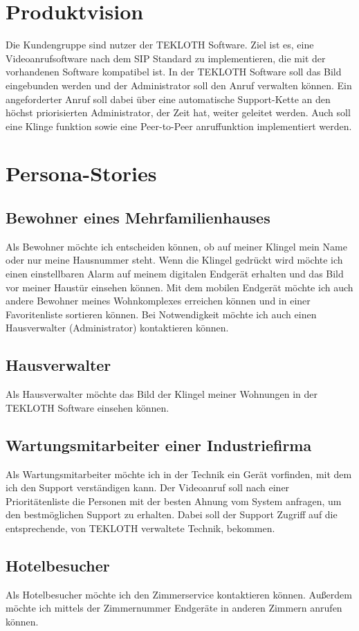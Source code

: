 \documentclass[12pt]{article}
\begin{document}
    \section{Produktvision}\label{sec:produktvision}
    Die Kundengruppe sind nutzer der TEKLOTH Software.
    Ziel ist es, eine Videoanrufsoftware nach dem SIP Standard zu implementieren, die mit der vorhandenen Software kompatibel ist.
    In der TEKLOTH Software soll das Bild eingebunden werden und der Administrator soll den Anruf verwalten können.
    Ein angeforderter Anruf soll dabei über eine automatische Support-Kette an den höchst priorisierten Administrator, der Zeit hat, weiter geleitet werden.
    Auch soll eine Klinge funktion sowie eine Peer-to-Peer anruffunktion implementiert werden.

    \section{Persona-Stories}\label{sec:persona-stories}
    \subsection{Bewohner eines Mehrfamilienhauses}\label{subsec:bewohner-eines-mehrfamilienhauses}
    Als Bewohner möchte ich entscheiden können, ob auf meiner Klingel mein Name oder nur meine Hausnummer steht.
    Wenn die Klingel gedrückt wird möchte ich einen einstellbaren Alarm auf meinem digitalen Endgerät erhalten und das Bild vor meiner Haustür einsehen können.
    Mit dem mobilen Endgerät möchte ich auch andere Bewohner meines Wohnkomplexes erreichen können und in einer Favoritenliste sortieren können.
    Bei Notwendigkeit möchte ich auch einen Hausverwalter (Administrator) kontaktieren können.


    \subsection{Hausverwalter}\label{subsec:hausverwalter}
    Als Hausverwalter möchte das Bild der Klingel meiner Wohnungen in der TEKLOTH Software einsehen können.


    \subsection{Wartungsmitarbeiter einer Industriefirma}\label{subsec:wartungsmitarbeiter-einer-industriefirma}
    Als Wartungsmitarbeiter möchte ich in der Technik ein Gerät vorfinden, mit dem ich den Support verständigen kann.
    Der Videoanruf soll nach einer Prioritätenliste die Personen mit der besten Ahnung vom System anfragen, um den bestmöglichen Support zu erhalten.
    Dabei soll der Support Zugriff auf die entsprechende, von TEKLOTH verwaltete Technik, bekommen.


    \subsection{Hotelbesucher}\label{subsec:hotelbesucher}
    Als Hotelbesucher möchte ich den Zimmerservice kontaktieren können.
    Außerdem möchte ich mittels der Zimmernummer Endgeräte in anderen Zimmern anrufen können.


\end{document}
